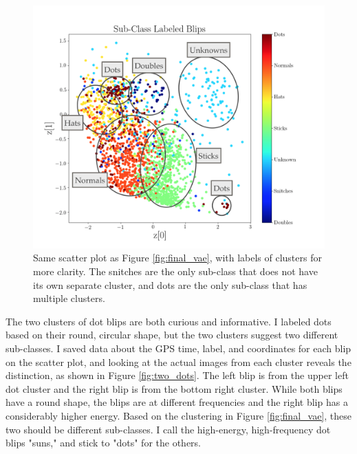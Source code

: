 \documentclass[a4paper]{article}
\begin{document}
\begin{figure}[h!]
	\centering
	\includegraphics[width=.8\linewidth]{vae_detailed}
	\caption{Same scatter plot as Figure \ref{fig:final_vae}, with labels of clusters for more clarity. The snitches are the only sub-class that does not have its own separate cluster, and dots are the only sub-class that has multiple clusters.}
	\label{fig:detailed_vae}
\end{figure}

The two clusters of dot blips are both curious and informative. I labeled dots based on their round, circular shape, but the two clusters suggest two different sub-classes. I saved data about the GPS time, label, and coordinates for each blip on the scatter plot, and looking at the actual images from each cluster reveals the distinction, as shown in Figure \ref{fig:two_dots}. The left blip is from the upper left dot cluster and the right blip is from the bottom right cluster. While both blips have a round shape, the blips are at different frequencies and the right blip has a considerably higher energy. Based on the clustering in Figure \ref{fig:final_vae}, these two should be different sub-classes. I call the high-energy, high-frequency dot blips "suns," and stick to "dots" for the others.
\end{document}
